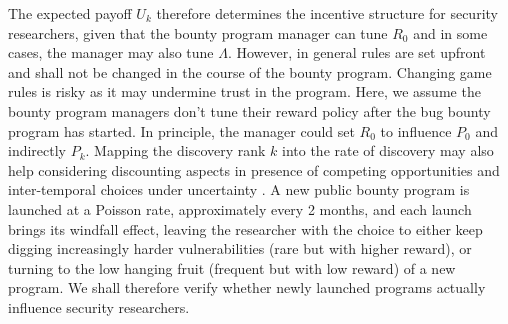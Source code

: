  The expected payoff $U_k$ therefore determines the incentive structure for security researchers, given that the bounty program manager can tune $R_0$ and in some cases, the manager may also tune $\Lambda$. However, in general rules are set upfront and shall not be changed in the course of the bounty program. Changing game rules is risky as it may undermine trust in the program. Here, we assume the bounty program managers don't tune their reward policy after the bug bounty program has started. In principle, the manager could set $R_0$ to influence $P_0$ and indirectly $P_{k}$. Mapping the discovery rank $k$ into the rate of discovery may also help considering discounting aspects in presence of competing opportunities and inter-temporal choices under uncertainty \cite{loewenstein1992anomalies}. A new public bounty program is launched at a Poisson rate, approximately every 2 months, and each launch brings its windfall effect, leaving the researcher with the choice to either keep digging increasingly harder vulnerabilities (rare but with higher reward), or turning to the low hanging fruit (frequent but with low reward) of a new program. We shall therefore verify whether newly launched programs actually influence security researchers.








